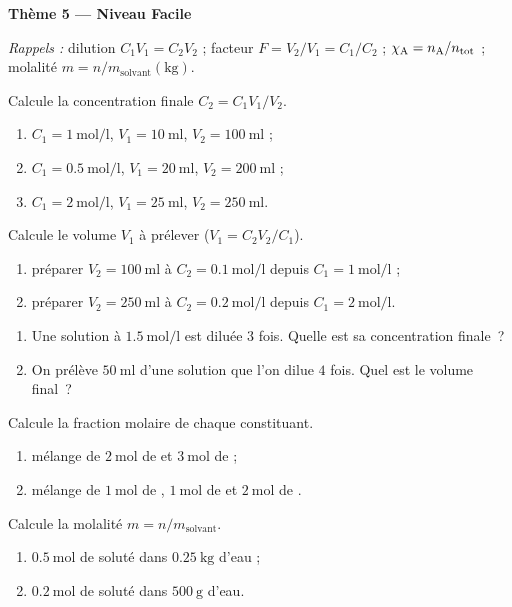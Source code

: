\documentclass[11pt,a4paper]{article}
\begin{document}
\begin{center}{\large\bfseries\color{primarydark} Thème 5 — Niveau Facile}\end{center}
\emph{Rappels :} dilution $C_1V_1 = C_2V_2$ ; facteur $F = V_2/V_1 = C_1/C_2$ ;
$\chi_{\ce{A}} = n_{\ce{A}}/n_{\text{tot}}$ ; molalité $m = n/m_{\text{solvant}}(\si{\kilo\gram})$.

\begin{exo}
Calcule la concentration finale $C_2 = C_1V_1/V_2$.
\begin{enumerate}[label=\alph*)]
  \item $C_1 = \SI{1}{\mole\per\litre}$, $V_1 = \SI{10}{\milli\litre}$, $V_2 = \SI{100}{\milli\litre}$ ;
  \item $C_1 = \SI{0.5}{\mole\per\litre}$, $V_1 = \SI{20}{\milli\litre}$, $V_2 = \SI{200}{\milli\litre}$ ;
  \item $C_1 = \SI{2}{\mole\per\litre}$, $V_1 = \SI{25}{\milli\litre}$, $V_2 = \SI{250}{\milli\litre}$.
\end{enumerate}
\end{exo}

\begin{exo}
Calcule le volume $V_1$ à prélever ($V_1 = C_2V_2/C_1$).
\begin{enumerate}[label=\alph*)]
  \item préparer $V_2 = \SI{100}{\milli\litre}$ à $C_2 = \SI{0.1}{\mole\per\litre}$ depuis $C_1 = \SI{1}{\mole\per\litre}$ ;
  \item préparer $V_2 = \SI{250}{\milli\litre}$ à $C_2 = \SI{0.2}{\mole\per\litre}$ depuis $C_1 = \SI{2}{\mole\per\litre}$.
\end{enumerate}
\end{exo}

\begin{exo}
\begin{enumerate}[label=\alph*)]
  \item Une solution à $\SI{1.5}{\mole\per\litre}$ est diluée $3$ fois. Quelle est sa concentration finale~?
  \item On prélève $\SI{50}{\milli\litre}$ d'une solution que l'on dilue $4$ fois. Quel est le volume final~?
\end{enumerate}
\end{exo}

\begin{exo}
Calcule la fraction molaire de chaque constituant.
\begin{enumerate}[label=\alph*)]
  \item mélange de $\SI{2}{\mole}$ de  et $\SI{3}{\mole}$ de  ;
  \item mélange de $\SI{1}{\mole}$ de , $\SI{1}{\mole}$ de  et $\SI{2}{\mole}$ de .
\end{enumerate}
\end{exo}

\begin{exo}[molalité]
Calcule la molalité $m = n/m_{\text{solvant}}$.
\begin{enumerate}[label=\alph*)]
  \item $\SI{0.5}{\mole}$ de soluté dans $\SI{0.25}{\kilo\gram}$ d'eau ;
  \item $\SI{0.2}{\mole}$ de soluté dans $\SI{500}{\gram}$ d'eau.
\end{enumerate}
\end{exo}
\end{document}
